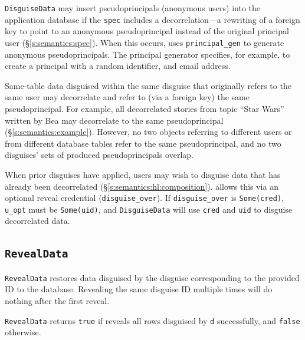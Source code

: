 %
\texttt{DisguiseData} may insert pseudoprincipals (anonymous users) into the
application database if the \texttt{spec} includes a decorrelation---a rewriting
of a foreign key to point to an anonymous pseudoprincipal instead of the
original principal user (\S\ref{s:semantics:spec}).  When this occurs, \sys
uses \texttt{principal\_gen} to generate anonymous pseudoprincipals. The
principal generator specifies, for example, to create a principal with a random
identifier, and email address.
%

%
Same-table data disguised within the same disguise that originally refers to the
same user may decorrelate and refer to (via a foreign key) the same
pseudoprincipal.
%
For example, all decorrelated stories from topic ``Star Wars'' written by Bea
may decorrelate to the same pseudoprincipal (\S\ref{s:semantics:example}).
%
However, no two objects referring to different users or from different database
tables refer to the same pseudoprincipal, and no two disguises' sets of produced
pseudoprincipals overlap.
%

When prior disguises have applied, users may wish to disguise data that has
already been decorrelated (\S\ref{s:semantics:hl:composition}).  \sys allows
this via an optional reveal credential (\texttt{disguise\_over}). If
\texttt{disguise\_over} is \texttt{Some(cred)}, \texttt{u\_opt} must be
\texttt{Some(uid)}, and \texttt{DisguiseData} will use \texttt{cred} and
\texttt{uid} to disguise decorrelated data.

\subsection{\texttt{RevealData}}
\label{s:semantics:revealdata}

\texttt{RevealData} restores data disguised by the disguise corresponding to the provided ID to
the database. Revealing the same disguise ID multiple times will do nothing
after the first reveal. 

\texttt{RevealData} returns \texttt{true} if \sys reveals all rows disguised by \texttt{d}
successfully, and \texttt{false} otherwise.

